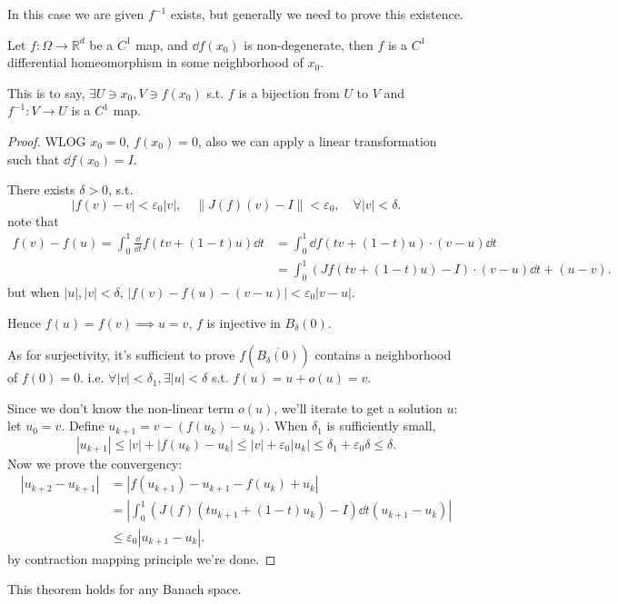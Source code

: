 In this case we are given $f^{-1}$ exists, but generally we need to
prove this existence.
\begin{theorem}
    Let $f: \Omega \to \mathbb{R}^{d}$ be a $C^1$ map,
	and $\dd f(x_0)$ is non-degenerate, then $f$ is a $C^1$ differential
	homeomorphism in some neighborhood of $x_0$.

	This is to say, $\exists U\ni x_0, V\ni f(x_0)$ s.t.
	$f$ is a bijection from $U$ to $V$ and $f^{-1}: V\to U$ is a $C^1$ map.
\end{theorem}
\begin{proof}[Proof]
    WLOG $x_0 = 0$, $f(x_0) = 0$, also we can apply a linear transformation
	such that $\dd f(x_0) = I$.

	There exists $\delta > 0$, s.t.
	\[
	|f(v) - v| < \varepsilon_0|v|, \quad  \lVert J(f)(v) - I \rVert < \varepsilon_0,
	\quad \forall |v| < \delta.
	\]
	note that
	\begin{align*}
	f(v) - f(u) = \int_{0}^{1} \frac{\dd}{\dd t}f(tv + (1-t)u)\dd t
	&= \int_{0}^{1} \dd f(tv + (1-t)u)\cdot (v-u)\dd t\\
	&= \int_{0}^{1} (Jf(tv + (1-t)u) - I)\cdot(v-u)\dd t + (u - v).
	\end{align*}
	but when $|u|, |v| < \delta$, $|f(v) - f(u) - (v-u)| < \varepsilon_0|v-u|$.

	Hence $f(u) = f(v)\implies u = v$, $f$ is injective in $B_\delta(0)$.

	As for surjectivity, it's sufficient to prove $f(\overline{B_\delta(0)})$
	contains a neighborhood of $f(0) = 0$.
	i.e. $\forall |v|<\delta_1, \exists |u|<\delta$ s.t. $f(u) = u + o(u) = v$.

	Since we don't know the non-linear term $o(u)$,
	we'll iterate to get a solution $u$: let $u_0 = v$.
	Define $u_{k+1} = v - (f(u_k) - u_k)$.
	When $\delta_1$ is sufficiently small,
	\[
	|u_{k+1}| \le |v| + |f(u_k) - u_k| \le |v| + \varepsilon_0|u_k|
	\le \delta_1 + \varepsilon_0\delta \le \delta.
	\]
	Now we prove the convergency:
	\begin{align*}
	|u_{k+2} - u_{k+1}| &= |f(u_{k+1}) - u_{k+1} - f(u_k) + u_k|\\
	&= |\int_{0}^{1} (J(f)(tu_{k+1} + (1-t)u_k) - I)\dd t (u_{k+1} - u_k)|\\
	&\le \varepsilon_0 |u_{k+1} - u_k|.
	\end{align*}
	by contraction mapping principle we're done.
\end{proof}
\begin{remark}
    This theorem holds for any Banach space.
\end{remark}

